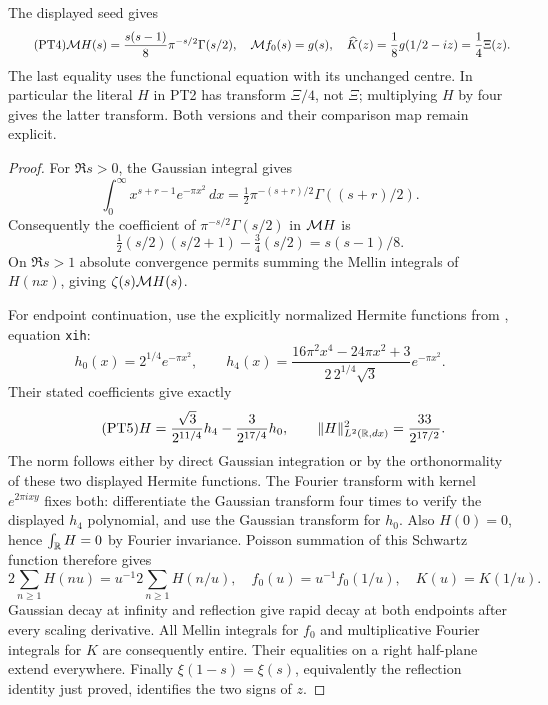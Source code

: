 \begin{swthetatheorem}
The displayed seed gives
\begin{equation}\tag{PT4}
 \mathcal M H(s)=\frac{s(s-1)}8\pi^{-s/2}\Gamma(s/2),\quad
 \mathcal M f_0(s)=g(s),\quad
 \widehat K(z)=\frac18g(1/2-iz)=\frac14\Xi(z).
\end{equation}
The last equality uses the functional equation with its unchanged
centre. In particular the literal $H$ in PT2 has transform
$\Xi/4$, not $\Xi$; multiplying $H$ by four gives the latter
transform. Both versions and their comparison map remain explicit.
\end{swthetatheorem}
\begin{proof}
For $\Re s>0$, the Gaussian integral gives
\[
 \int_0^\infty x^{s+r-1}e^{-\pi x^2}\,dx
  =\tfrac12\pi^{-(s+r)/2}\Gamma((s+r)/2).
\]
Consequently the coefficient of
$\pi^{-s/2}\Gamma(s/2)$ in $\mathcal M H$ is
\[
 \tfrac12(s/2)(s/2+1)-\tfrac34(s/2)=s(s-1)/8.
\]
On $\Re s>1$ absolute convergence permits summing the Mellin
integrals of $H(nx)$, giving $\zeta(s)\mathcal M H(s)$.

For endpoint continuation, use the explicitly normalized Hermite
functions from \cite{swtheta:CCM}, equation \texttt{xih}:
\[
 h_0(x)=2^{1/4}e^{-\pi x^2},\qquad
 h_4(x)=\frac{16\pi^2x^4-24\pi x^2+3}{2\,2^{1/4}\sqrt3}
                                  e^{-\pi x^2}.
\]
Their stated coefficients give exactly
\begin{equation}\tag{PT5}
 H=\frac{\sqrt3}{2^{11/4}}h_4-\frac3{2^{17/4}}h_0,
 \qquad \|H\|_{L^2(\mathbb R,dx)}^2=\frac{33}{2^{17/2}}.
\end{equation}
The norm follows either by direct Gaussian integration or by the
orthonormality of these two displayed Hermite functions.
The Fourier transform with kernel $e^{2\pi ixy}$ fixes both:
differentiate the Gaussian transform four times to verify the
displayed $h_4$ polynomial, and use the Gaussian transform for $h_0$.
Also $H(0)=0$, hence $\int_\mathbb R H=0$ by Fourier invariance.
Poisson summation of this Schwartz function therefore gives
\[
 2\sum_{n\geq1}H(nu)=u^{-1}2\sum_{n\geq1}H(n/u),
 \quad f_0(u)=u^{-1}f_0(1/u),\quad K(u)=K(1/u).
\]
Gaussian decay at infinity and reflection give rapid decay at
both endpoints after every scaling derivative. All Mellin
integrals for $f_0$ and multiplicative Fourier integrals for $K$
are consequently entire. Their equalities on a right half-plane
extend everywhere. Finally $\xi(1-s)=\xi(s)$, equivalently the
reflection identity just proved, identifies the two signs of $z$.
\end{proof}


